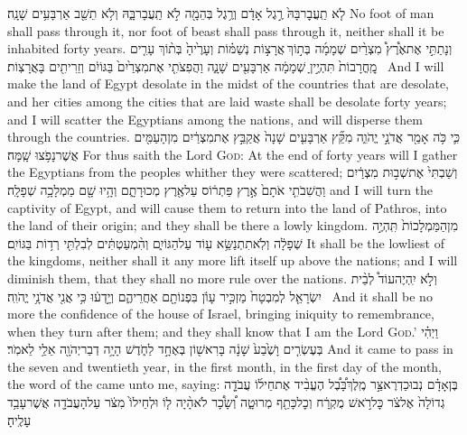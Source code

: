 {לֹ֤א תַֽעֲבׇר\maqqaf בָּהּ֙ רֶ֣גֶל אָדָ֔ם וְרֶ֥גֶל בְּהֵמָ֖ה לֹ֣א תַֽעֲבָר\maqqaf בָּ֑הּ וְלֹ֥א תֵשֵׁ֖ב אַרְבָּעִ֥ים שָׁנָֽה׃}
{No foot of man shall pass through it, nor foot of beast shall pass through it, neither shall it be inhabited forty years.}
{וְנָתַתִּ֣י אֶת\maqqaf אֶ֩רֶץ֩ מִצְרַ֨יִם שְׁמָמָ֜ה בְּת֣וֹךְ \legarmeh  אֲרָצ֣וֹת נְשַׁמּ֗וֹת וְעָרֶ֙יהָ֙ בְּת֨וֹךְ עָרִ֤ים מׇֽחֳרָבוֹת֙ תִּהְיֶ֣יןָ שְׁמָמָ֔ה אַרְבָּעִ֖ים שָׁנָ֑ה וַהֲפִצֹתִ֤י אֶת\maqqaf מִצְרַ֙יִם֙ בַּגּוֹיִ֔ם וְזֵרִיתִ֖ים בָּאֲרָצֽוֹת׃ \setuma }
{And I will make the land of Egypt desolate in the midst of the countries that are desolate, and her cities among the cities that are laid waste shall be desolate forty years; and I will scatter the Egyptians among the nations, and will disperse them through the countries.}
{כִּ֛י כֹּ֥ה אָמַ֖ר אֲדֹנָ֣י יֱהֹוִ֑ה מִקֵּ֞ץ אַרְבָּעִ֤ים שָׁנָה֙ אֲקַבֵּ֣ץ אֶת\maqqaf מִצְרַ֔יִם מִן\maqqaf הָעַמִּ֖ים אֲשֶׁר\maqqaf נָפֹ֥צוּ שָֽׁמָּה׃}
{For thus saith the Lord \textsc{God}: At the end of forty years will I gather the Egyptians from the peoples whither they were scattered;}
{וְשַׁבְתִּי֙ אֶת\maqqaf שְׁב֣וּת מִצְרַ֔יִם וַהֲשִׁבֹתִ֤י אֹתָם֙ אֶ֣רֶץ פַּתְר֔וֹס עַל\maqqaf אֶ֖רֶץ מְכוּרָתָ֑ם וְהָ֥יוּ שָׁ֖ם מַמְלָכָ֥ה שְׁפָלָֽה׃}
{and I will turn the captivity of Egypt, and will cause them to return into the land of Pathros, into the land of their origin; and they shall be there a lowly kingdom.}
{מִן\maqqaf הַמַּמְלָכוֹת֙ תִּֽהְיֶ֣ה שְׁפָלָ֔ה וְלֹֽא\maqqaf תִתְנַשֵּׂ֥א ע֖וֹד עַל\maqqaf הַגּוֹיִ֑ם וְהִ֨מְעַטְתִּ֔ים לְבִלְתִּ֖י רְד֥וֹת בַּגּוֹיִֽם׃}
{It shall be the lowliest of the kingdoms, neither shall it any more lift itself up above the nations; and I will diminish them, that they shall no more rule over the nations.}
{וְלֹ֣א יִֽהְיֶה\maqqaf עוֹד֩ לְבֵ֨ית יִשְׂרָאֵ֤ל לְמִבְטָח֙ מַזְכִּ֣יר עָוֺ֔ן בִּפְנוֹתָ֖ם אַחֲרֵיהֶ֑ם וְיָ֣דְע֔וּ כִּ֥י אֲנִ֖י אֲדֹנָ֥י יֱהֹוִֽה׃ \petucha }
{And it shall be no more the confidence of the house of Israel, bringing iniquity to remembrance, when they turn after them; and they shall know that I am the Lord \textsc{God}.’}
{וַיְהִ֗י בְּעֶשְׂרִ֤ים וָשֶׁ֙בַע֙ שָׁנָ֔ה בָּרִאשׁ֖וֹן בְּאֶחָ֣ד לַחֹ֑דֶשׁ הָיָ֥ה דְבַר\maqqaf יְהֹוָ֖ה אֵלַ֥י לֵאמֹֽר׃}
{And it came to pass in the seven and twentieth year, in the first month, in the first day of the month, the word of the \lord\space came unto me, saying:}
{בֶּן\maqqaf אָדָ֗ם נְבוּכַדְרֶאצַּ֣ר מֶֽלֶךְ\maqqaf בָּ֠בֶ֠ל הֶעֱבִ֨יד אֶת\maqqaf חֵיל֜וֹ עֲבֹדָ֤ה גְדוֹלָה֙ אֶל\maqqaf צֹ֔ר כׇּל\maqqaf רֹ֣אשׁ מֻקְרָ֔ח וְכׇל\maqqaf כָּתֵ֖ף מְרוּטָ֑ה וְ֠שָׂכָ֠ר לֹא\maqqaf הָ֨יָה ל֤וֹ וּלְחֵילוֹ֙ מִצֹּ֔ר עַל\maqqaf הָעֲבֹדָ֖ה אֲשֶׁר\maqqaf עָבַ֥ד עָלֶֽיהָ׃ \setuma }
